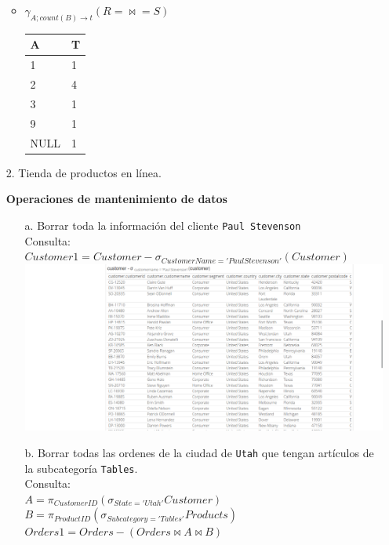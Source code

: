 \documentclass[12pt,a4paper]{article}
\begin{document}
\begin{enumerate}
\begin{itemize}
			\item $\gamma_{A ; count(B) \rightarrow t} (R =\bowtie= S)$\\
				\begin{tabular}{|l|l|}
					\hline
					A		&T\\
					\hline
					1		&1\\
					2		&4\\
					3		&1\\
					9		&1\\
					NULL	&1\\
					\hline
				\end{tabular}

		\end{itemize}


	\item[2.] Tienda de productos en línea.
	\pagebreak

		\textbf{Operaciones de mantenimiento de datos}\\
		\begin{enumerate}
			\item [a.] Borrar toda la información del cliente \texttt{Paul Stevenson}\\
				Consulta: $Customer1 = Customer - \sigma_{CustomerName='Paul Stevenson'}(Customer)$\\

				\includegraphics[scale=0.4]{assets/mantenimiento_datos-a.png}

			\pagebreak
			\item [b.] Borrar todas las ordenes de la ciudad de \texttt{Utah} que tengan artículos
				de la subcategoría \texttt{Tables}.\\
				Consulta:\\
				$A = \pi_{CustomerID} (\sigma_{State = 'Utah'} Customer)$\\
				$B = \pi_{ProductID} (\sigma_{Subcategory = 'Tables'} Products)$\\
				$Orders1 = Orders - (Orders \bowtie A \bowtie B)$\\


\end{enumerate}
\end{enumerate}
\end{document}
